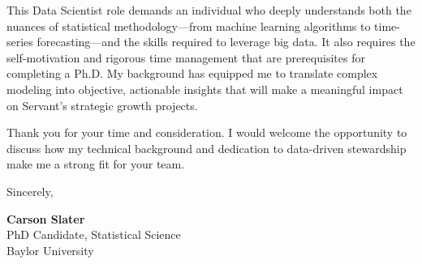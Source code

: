 \documentclass[11pt]{article}
\begin{document}
This Data Scientist role demands an individual who deeply understands both the nuances of statistical methodology—from machine learning algorithms to time-series forecasting—and the skills required to leverage big data. It also requires the self-motivation and rigorous time management that are prerequisites for completing a Ph.D. My background has equipped me to translate complex modeling into objective, actionable insights that will make a meaningful impact on Servant's strategic growth projects.

Thank you for your time and consideration. I would welcome the opportunity to discuss how my technical background and dedication to data-driven stewardship make me a strong fit for your team.



\vspace{1.5em}
\noindent
Sincerely,

\vspace{2.5em}
\noindent
\textbf{Carson Slater} \\
PhD Candidate, Statistical Science \\
Baylor University
\end{document}
